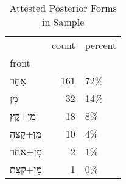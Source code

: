 \begin{table}[htbp!]
\centering
\caption{Attested Posterior Forms in Sample}
\label{table:post_front}
\begin{tabular}{lrl}
\toprule
{} &  count & percent \\
front                  &        &         \\
\midrule
\texthebrew{אַחַר}     &    161 &     72\% \\
\texthebrew{מִן}       &     32 &     14\% \\
\texthebrew{מִן+קֵץ}   &     18 &      8\% \\
\texthebrew{מִן+קָצֶה} &     10 &      4\% \\
\texthebrew{מִן+אַחַר} &      2 &      1\% \\
\texthebrew{מִן+קְצָת} &      1 &      0\% \\
\bottomrule
\end{tabular}
\end{table}
